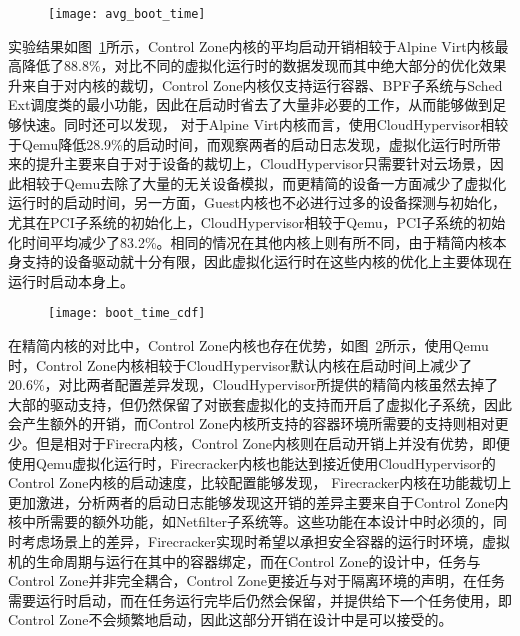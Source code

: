 \begin{figure}[H]
    \centering
    \texttt{[image: avg\_boot\_time]}
    \label{fig:avg_boot_time}
\end{figure}

实验结果如图~\ref{fig:avg_boot_time}所示，Control Zone内核的平均启动开销相较于Alpine Virt内核最高降低了88.8\%，对比不同的虚拟化运行时的数据发现而其中绝大部分的优化效果升来自于对内核的裁切，Control Zone内核仅支持运行容器、BPF子系统与Sched Ext调度类的最小功能，因此在启动时省去了大量非必要的工作，从而能够做到足够快速。同时还可以发现， 对于Alpine Virt内核而言，使用CloudHypervisor相较于Qemu降低28.9\%的启动时间，而观察两者的启动日志发现，虚拟化运行时所带来的提升主要来自于对于设备的裁切上，CloudHypervisor只需要针对云场景，因此相较于Qemu去除了大量的无关设备模拟，而更精简的设备一方面减少了虚拟化运行时的启动时间，另一方面，Guest内核也不必进行过多的设备探测与初始化，尤其在PCI子系统的初始化上，CloudHypervisor相较于Qemu，PCI子系统的初始化时间平均减少了83.2\%。相同的情况在其他内核上则有所不同，由于精简内核本身支持的设备驱动就十分有限，因此虚拟化运行时在这些内核的优化上主要体现在运行时启动本身上。

\begin{figure}[!htbp]
    \centering
    \texttt{[image: boot\_time\_cdf]}
    \label{fig:boot_time_cdf}
\end{figure}

在精简内核的对比中，Control Zone内核也存在优势，如图~\ref{fig:boot_time_cdf}所示，使用Qemu时，Control Zone内核相较于CloudHypervisor默认内核在启动时间上减少了20.6\%，对比两者配置差异发现，CloudHypervisor所提供的精简内核虽然去掉了大部的驱动支持，但仍然保留了对嵌套虚拟化的支持而开启了虚拟化子系统，因此会产生额外的开销，而Control Zone内核所支持的容器环境所需要的支持则相对更少。但是相对于Firecra内核，Control Zone内核则在启动开销上并没有优势，即便使用Qemu虚拟化运行时，Firecracker内核也能达到接近使用CloudHypervisor的Control Zone内核的启动速度，比较配置能够发现， Firecracker内核在功能裁切上更加激进，分析两者的启动日志能够发现这开销的差异主要来自于Control Zone内核中所需要的额外功能，如Netfilter子系统等。这些功能在本设计中时必须的，同时考虑场景上的差异，Firecracker实现时希望以承担安全容器的运行时环境，虚拟机的生命周期与运行在其中的容器绑定，而在Control Zone的设计中，任务与Control Zone并非完全耦合，Control Zone更接近与对于隔离环境的声明，在任务需要运行时启动，而在任务运行完毕后仍然会保留，并提供给下一个任务使用，即Control Zone不会频繁地启动，因此这部分开销在设计中是可以接受的。

